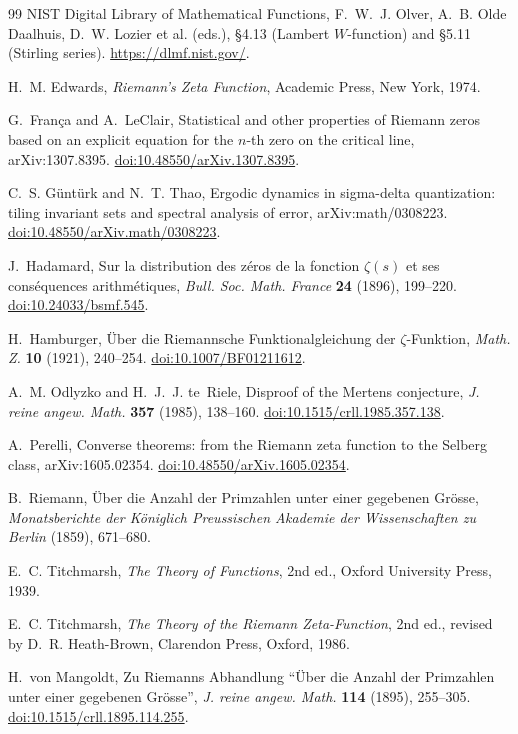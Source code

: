 \documentclass[11pt,reqno]{amsart}
\numberwithin{equation}{section}
\theoremstyle{plain}
\theoremstyle{definition}
\theoremstyle{remark}
\begin{document}
\begin{thebibliography}{99}
NIST Digital Library of Mathematical Functions, F.~W.~J. Olver, A.~B. Olde Daalhuis, D.~W. Lozier et al. (eds.), \S4.13 (Lambert $W$-function) and \S5.11 (Stirling series).
\url{https://dlmf.nist.gov/}.

H.~M. Edwards, \emph{Riemann's Zeta Function}, Academic Press, New York, 1974.

G.~Fran\c{c}a and A.~LeClair, Statistical and other properties of Riemann zeros based on an explicit equation for the $n$-th zero on the critical line, arXiv:1307.8395.
\href{https://doi.org/10.48550/arXiv.1307.8395}{doi:10.48550/arXiv.1307.8395}.

C.~S. G\"unt\"urk and N.~T. Thao, Ergodic dynamics in sigma-delta quantization: tiling invariant sets and spectral analysis of error, arXiv:math/0308223.
\href{https://doi.org/10.48550/arXiv.math/0308223}{doi:10.48550/arXiv.math/0308223}.

J.~Hadamard, Sur la distribution des z\'eros de la fonction $\zeta(s)$ et ses cons\'equences arithm\'etiques, \emph{Bull. Soc. Math. France} \textbf{24} (1896), 199--220.
\href{https://doi.org/10.24033/bsmf.545}{doi:10.24033/bsmf.545}.

H.~Hamburger, \"Uber die Riemannsche Funktionalgleichung der $\zeta$-Funktion, \emph{Math. Z.} \textbf{10} (1921), 240--254.
\href{https://doi.org/10.1007/BF01211612}{doi:10.1007/BF01211612}.

A.~M. Odlyzko and H.~J.~J. te~Riele, Disproof of the Mertens conjecture, \emph{J. reine angew. Math.} \textbf{357} (1985), 138--160.
\href{https://doi.org/10.1515/crll.1985.357.138}{doi:10.1515/crll.1985.357.138}.

A.~Perelli, Converse theorems: from the Riemann zeta function to the Selberg class, arXiv:1605.02354.
\href{https://doi.org/10.48550/arXiv.1605.02354}{doi:10.48550/arXiv.1605.02354}.

B.~Riemann, \"Uber die Anzahl der Primzahlen unter einer gegebenen Gr\"osse, \emph{Monatsberichte der K\"oniglich Preussischen Akademie der Wissenschaften zu Berlin} (1859), 671--680.

E.~C. Titchmarsh, \emph{The Theory of Functions}, 2nd ed., Oxford University Press, 1939.

E.~C. Titchmarsh, \emph{The Theory of the Riemann Zeta-Function}, 2nd ed., revised by D.~R. Heath-Brown, Clarendon Press, Oxford, 1986.

H.~von Mangoldt, Zu Riemanns Abhandlung ``\"Uber die Anzahl der Primzahlen unter einer gegebenen Gr\"osse'', \emph{J. reine angew. Math.} \textbf{114} (1895), 255--305.
\href{https://doi.org/10.1515/crll.1895.114.255}{doi:10.1515/crll.1895.114.255}.

\end{thebibliography}
\end{document}
